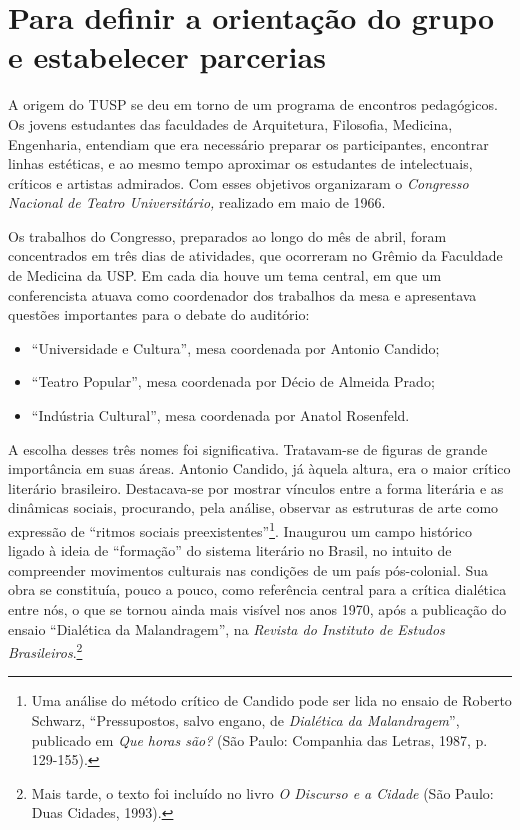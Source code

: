 \section{Para definir a orientação do grupo e estabelecer parcerias}

A origem do TUSP se deu em torno de um programa de encontros
pedagógicos. Os jovens estudantes das faculdades de Arquitetura,
Filosofia, Medicina, Engenharia, entendiam que era necessário preparar
os participantes, encontrar linhas estéticas, e ao mesmo tempo aproximar
os estudantes de intelectuais, críticos e artistas admirados. Com esses
objetivos organizaram o \textit{Congresso Nacional de Teatro
Universitário,} realizado em maio de 1966.

Os trabalhos do Congresso, preparados ao longo do mês de abril, foram
concentrados em três dias de atividades, que ocorreram no Grêmio da
Faculdade de Medicina da USP. Em cada dia houve um tema central, em que
um conferencista atuava como coordenador dos trabalhos da mesa e
apresentava questões importantes para o debate do auditório:

\begin{itemize}
\item
  “Universidade e Cultura”, mesa coordenada por Antonio Candido;
\item
  “Teatro Popular”, mesa coordenada por Décio de Almeida Prado;
\item
  “Indústria Cultural”, mesa coordenada por Anatol Rosenfeld.
\end{itemize}

A escolha desses três nomes foi significativa. Tratavam-se de figuras de
grande importância em suas áreas. Antonio Candido, já àquela altura, era
o maior crítico literário brasileiro. Destacava-se por mostrar vínculos
entre a forma literária e as dinâmicas sociais, procurando, pela
análise, observar as estruturas de arte como expressão de “ritmos
sociais preexistentes”\footnote{Uma análise do método crítico de Candido
  pode ser lida no ensaio de Roberto Schwarz, “Pressupostos, salvo
  engano, de \textit{Dialética da Malandragem}”, publicado em \textit{Que
  horas são?} (São Paulo: Companhia das Letras, 1987, p. 129-155).}.
Inaugurou um campo histórico ligado à ideia de “formação” do sistema
literário no Brasil, no intuito de compreender movimentos culturais nas
condições de um país pós-colonial. Sua obra se constituía, pouco a
pouco, como referência central para a crítica dialética entre nós, o que
se tornou ainda mais visível nos anos 1970, após a publicação do ensaio
“Dialética da Malandragem”, na \textit{Revista do Instituto de Estudos
Brasileiros}.\footnote{Mais tarde, o texto foi incluído no livro \textit{O
  Discurso e a Cidade} (São Paulo: Duas Cidades, 1993).}

